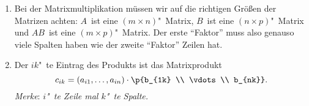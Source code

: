 \documentclass[a4paper]{article}
\begin{document}
\begin{remark}\leavevmode
    \begin{enumerate}
        \item Bei der Matrixmultiplikation müssen wir auf die richtigen Größen der Matrizen achten: $A$~ist eine $(m\times n)$"~Matrix, $B$~ist eine $(n\times p)$"~Matrix und $AB$~ist eine $(m\times p)$"~Matrix. Der erste "`Faktor"' muss also genauso viele Spalten haben wie der zweite "`Faktor"' Zeilen hat.
        \item Der $ik$"~te Eintrag des Produkts ist das Matrixprodukt
              \begin{equation*}
                  c_{ik} = (a_{i1}, \dots, a_{in}) \cdot \p{b_{1k} \\ \vdots \\ b_{nk}}.
              \end{equation*}
              \emph{Merke}: \emph{$i$"~te Zeile mal $k$"~te Spalte.}
    \end{enumerate}
\end{remark}
\end{document}
